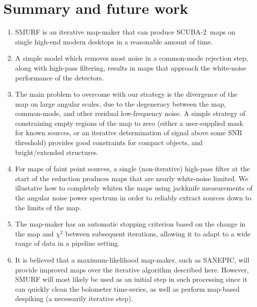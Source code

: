 \documentclass[useAMS,usenatbib,nofootinbib]{mn2e}
\newcommand{\scuba}{SCUBA-2}
\begin{document}
\section{Summary and future work}
\label{sec:summary}

\begin{enumerate}

\item SMURF is an iterative map-maker that can produce \scuba\ maps on
single high-end modern desktops in a reasonable amount of time.

\item A simple model which removes most noise in a common-mode
rejection step, along with high-pass filtering, results in maps that
approach the white-noise performance of the detectors.

\item The main problem to overcome with our strategy is the divergence
of the map on large angular scales, due to the degeneracy between the
map, common-mode, and other residual low-frequency noise. A simple
strategy of constraining empty regions of the map to zero (either a
user-supplied mask for known sources, or an iterative determination of
signal above some SNR threshold) provides good constraints for compact
objects, and bright/extended structures.

\item For maps of faint point sources, a single (non-iterative)
high-pass filter at the start of the reduction produces maps that are
nearly white-noise limited. We illustatre how to completely whiten the
maps using jackknife measurements of the angular noise power spectrum
in order to reliably extract sources down to the limits of the map.

\item The map-maker has an automatic stopping criterion based on the
change in the map and $\chi^2$ between subsequent iterations, allowing
it to adapt to a wide range of data in a pipeline setting.

\item It is believed that a maximum-likelihood map-maker, such as
SANEPIC, will provide improved maps over the iterative algorithm
described here. However, SMURF will most likely be used as an initial
step in such processing since it can quickly clean the bolometer
time-series, as well as perform map-based despiking (a necessarily
iterative step).


\end{enumerate}
\end{document}

